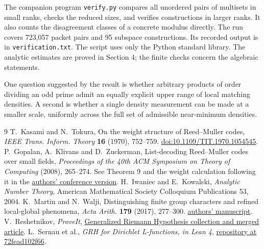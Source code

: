 \documentclass[11pt,letterpaper]{article}
\begin{document}
The companion program \texttt{verify.py} compares all unordered pairs of multisets in small ranks, checks the reduced sizes, and verifies constructions in larger ranks. It also counts the disagreement classes of a concrete modulus directly. The run covers 723,057 packet pairs and 95 subspace constructions. Its recorded output is in \texttt{verification.txt}. The script uses only the Python standard library. The analytic estimates are proved in Section 4; the finite checks concern the algebraic statements.

One question suggested by the result is whether arbitrary products of order dividing an odd prime admit an equally explicit upper range of local matching densities. A second is whether a single density measurement can be made at a smaller scale, uniformly across the full set of admissible near-minimum densities.

\begin{thebibliography}{9}\small
{} T.~Kasami and N.~Tokura, On the weight structure of Reed--Muller codes, \emph{IEEE Trans. Inform. Theory} \textbf{16} (1970), 752--759. \href{https://doi.org/10.1109/TIT.1970.1054545}{doi:10.1109/TIT.1970.1054545}.
 P.~Gopalan, A.~Klivans and D.~Zuckerman, List-decoding Reed--Muller codes over small fields, \emph{Proceedings of the 40th ACM Symposium on Theory of Computing} (2008), 265--274. See Theorem 9 and the weight calculation following it in the \href{https://www.cs.utexas.edu/~klivans/rm.pdf}{authors' conference version}.
 H.~Iwaniec and E.~Kowalski, \emph{Analytic Number Theory}, American Mathematical Society Colloquium Publications 53, 2004.
 K.~Martin and N.~Walji, Distinguishing finite group characters and refined local-global phenomena, \emph{Acta Arith.} \textbf{179} (2017), 277--300. \href{https://kimballmartin.github.io/papers/dist-artin.pdf}{authors' manuscript}.
 V.~Reshetnikov, \emph{ProveIt}, \href{https://github.com/VladimirReshetnikov/ProveIt/tree/main/Analysis/GeneralizedRiemannHypothesis}{Generalized Riemann Hypothesis collection and merged article}.
 L.~Sernau et al., \emph{GRH for Dirichlet L-functions, in Lean 4}, \href{https://github.com/lsernau/grh-lean/tree/72fead102f663d5c7a407964a13dc0cf9d977207}{repository at 72fead102f66}.
\end{thebibliography}
\end{document}

